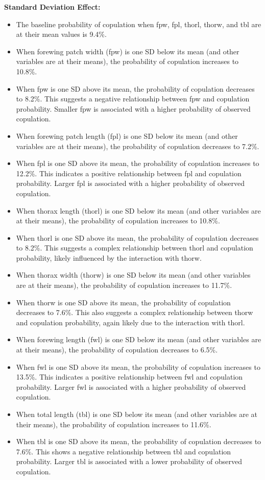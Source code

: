 \documentclass[
]{article}
\providecommand{\tightlist}{%
  \setlength{\itemsep}{0pt}\setlength{\parskip}{0pt}}
\begin{document}
\textbf{Standard Deviation Effect:}

\begin{itemize}
\tightlist
\item
  The baseline probability of copulation when fpw, fpl, thorl, thorw,
  and tbl are at their mean values is 9.4\%.
\item
  When forewing patch width (fpw) is one SD below its mean (and other
  variables are at their means), the probability of copulation increases
  to 10.8\%.
\item
  When fpw is one SD above its mean, the probability of copulation
  decreases to 8.2\%. This suggests a negative relationship between fpw
  and copulation probability. Smaller fpw is associated with a higher
  probability of observed copulation.
\item
  When forewing patch length (fpl) is one SD below its mean (and other
  variables are at their means), the probability of copulation decreases
  to 7.2\%.
\item
  When fpl is one SD above its mean, the probability of copulation
  increases to 12.2\%. This indicates a positive relationship between
  fpl and copulation probability. Larger fpl is associated with a higher
  probability of observed copulation.
\item
  When thorax length (thorl) is one SD below its mean (and other
  variables are at their means), the probability of copulation increases
  to 10.8\%.
\item
  When thorl is one SD above its mean, the probability of copulation
  decreases to 8.2\%. This suggests a complex relationship between thorl
  and copulation probability, likely influenced by the interaction with
  thorw.
\item
  When thorax width (thorw) is one SD below its mean (and other
  variables are at their means), the probability of copulation increases
  to 11.7\%.
\item
  When thorw is one SD above its mean, the probability of copulation
  decreases to 7.6\%. This also suggests a complex relationship between
  thorw and copulation probability, again likely due to the interaction
  with thorl.
\item
  When forewing length (fwl) is one SD below its mean (and other
  variables are at their means), the probability of copulation decreases
  to 6.5\%.
\item
  When fwl is one SD above its mean, the probability of copulation
  increases to 13.5\%. This indicates a positive relationship between
  fwl and copulation probability. Larger fwl is associated with a higher
  probability of observed copulation.
\item
  When total length (tbl) is one SD below its mean (and other variables
  are at their means), the probability of copulation increases to
  11.6\%.
\item
  When tbl is one SD above its mean, the probability of copulation
  decreases to 7.6\%. This shows a negative relationship between tbl and
  copulation probability. Larger tbl is associated with a lower
  probability of observed copulation.
\end{itemize}
\end{document}
